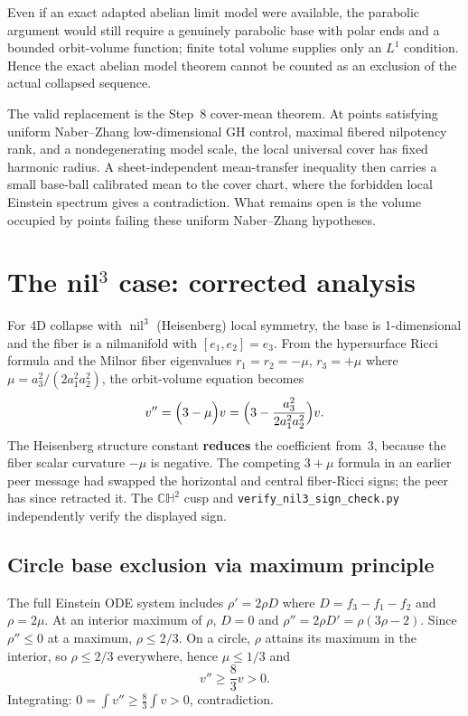 Even if an exact adapted abelian limit model were available, the parabolic
argument would still require a genuinely parabolic base with polar ends and a
bounded orbit-volume function; finite total volume supplies only an $L^1$
condition.  Hence the exact abelian model theorem cannot be counted as an
exclusion of the actual collapsed sequence.

The valid replacement is the Step~8 cover-mean theorem.  At points satisfying
uniform Naber--Zhang low-dimensional GH control, maximal fibered nilpotency
rank, and a nondegenerating model scale, the local universal cover has fixed
harmonic radius.  A sheet-independent mean-transfer inequality then carries a
small base-ball calibrated mean to the cover chart, where the forbidden local
Einstein spectrum gives a contradiction.  What remains open is the volume
occupied by points failing these uniform Naber--Zhang hypotheses.

\section{The nil$^3$ case: corrected analysis}

For 4D collapse with $\operatorname{nil}^3$ (Heisenberg) local symmetry,
the base is 1-dimensional and the fiber is a nilmanifold with
$[e_1,e_2]=e_3$.  From the hypersurface Ricci formula
and the Milnor fiber eigenvalues $r_1=r_2=-\mu$, $r_3=+\mu$
where $\mu=a_3^2/(2a_1^2a_2^2)$, the orbit-volume equation becomes
\begin{equation}\label{eq:nil3}
 v''=\Bigl(3-\mu\Bigr)v
 =\Bigl(3-\frac{a_3^2}{2a_1^2a_2^2}\Bigr)v.
\end{equation}
The Heisenberg structure constant \textbf{reduces} the coefficient from~3,
because the fiber scalar curvature $-\mu$ is negative.  The competing
$3+\mu$ formula in an earlier peer message had swapped the horizontal and
central fiber-Ricci signs; the peer has since retracted it.  The
$\mathbb{CH}^2$ cusp and \texttt{verify\_nil3\_sign\_check.py} independently
verify the displayed sign.

\subsection*{Circle base exclusion via maximum principle}
The full Einstein ODE system includes
$\rho'=2\rho D$ where $D=f_3-f_1-f_2$ and $\rho=2\mu$.
At an interior maximum of $\rho$, $D=0$ and
$\rho''=2\rho D'=\rho(3\rho-2)$.  Since $\rho''\le0$ at a maximum,
$\rho\le2/3$.  On a circle, $\rho$ attains its maximum in the interior,
so $\rho\le2/3$ everywhere, hence $\mu\le1/3$ and
\[
 v''\ge\frac83v>0.
\]
Integrating: $0=\int v''\ge\frac83\int v>0$, contradiction.

